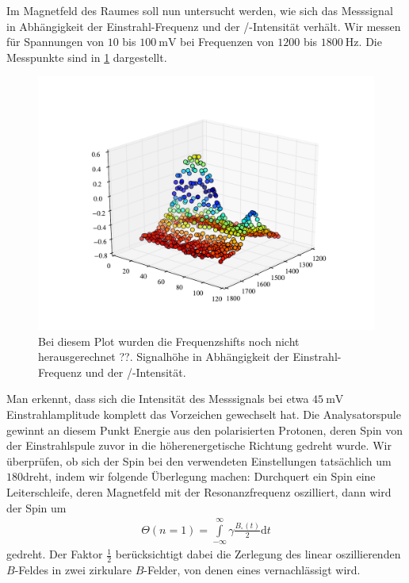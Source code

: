 \documentclass[paper=a4,
	fontsize=10pt,
	DIV=18,
	twocolumn,
	parskip=half
	]{scrartcl}
\numberwithin{equation}{section}    %
\begin{document}
Im Magnetfeld des Raumes soll nun untersucht werden, wie sich das Messsignal in Abhängigkeit der Einstrahl-Frequenz und der /-Intensität verhält.
Wir messen für Spannungen von $10$ bis $\SI{100}{\milli\volt}$ bei Frequenzen von $1200$ bis $\SI{1800}{\hertz}$.
Die Messpunkte sind in \cref{phasenraum} dargestellt.
\begin{figure}[htp]
	\begin{center}
		\includegraphics[width=\columnwidth]{Data-Plots/07-Phasenraum.pdf}
		\caption{Bei diesem Plot wurden die Frequenzshifts noch nicht herausgerechnet ??. Signalhöhe in Abhängigkeit der Einstrahl-Frequenz und der /-Intensität.}
		\label{phasenraum}
	\end{center}
\end{figure}
Man erkennt, dass sich die Intensität des Messsignals bei etwa $\SI{45}{\milli\volt}$ Einstrahlamplitude komplett das Vorzeichen gewechselt hat. 
Die Analysatorspule gewinnt an diesem Punkt Energie aus den polarisierten Protonen, deren Spin von der Einstrahlspule zuvor in die höherenergetische Richtung gedreht wurde.
Wir überprüfen, ob sich der Spin bei den verwendeten Einstellungen tatsächlich um $180$\textdegree dreht, indem wir folgende Überlegung machen:
Durchquert ein Spin eine Leiterschleife, deren Magnetfeld mit der Resonanzfrequenz oszilliert, dann wird der Spin um
\begin{align}
	\Theta(n=1)= \overset{\infty}{\underset{-\infty}{\int}} \gamma \frac{B_\circ(t)}{2} \mathrm{d}t
\end{align}
gedreht. Der Faktor $\frac{1}{2}$ berücksichtigt dabei die Zerlegung des linear oszillierenden $B$-Feldes in zwei zirkulare $B$-Felder, von denen eines vernachlässigt wird.
\end{document}
